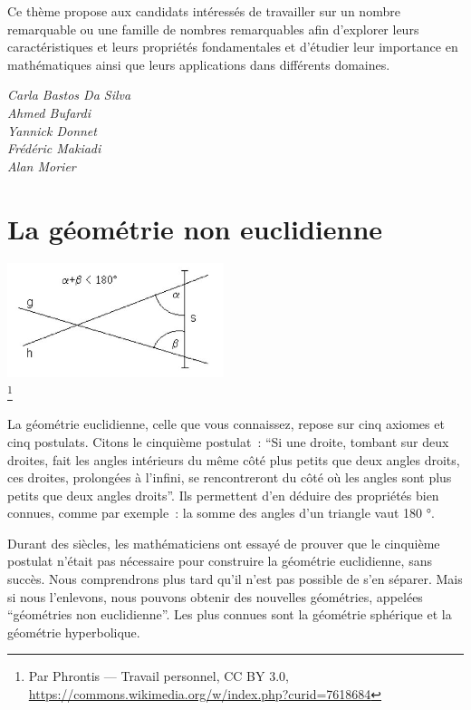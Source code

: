 \documentclass[
  10pt,
  french,
  a5paper,
  openany]{book}
\newenvironment{signature}{\begin{flushright}}{\end{flushright}}
\begin{document}
Ce thème propose aux candidats intéressés de travailler sur un nombre remarquable ou une famille de nombres remarquables afin d'explorer leurs caractéristiques et leurs propriétés fondamentales et d'étudier leur importance en mathématiques ainsi que leurs applications dans différents domaines.

\begin{signature}
\emph{Carla Bastos Da Silva}\\
\emph{Ahmed Bufardi}\\
\emph{Yannick Donnet}\\
\emph{Frédéric Makiadi}\\
\emph{Alan Morier}

\end{signature}

\hypertarget{la-guxe9omuxe9trie-non-euclidienne}{%
\chapter{La géométrie non euclidienne}\label{la-guxe9omuxe9trie-non-euclidienne}}


\begin{center}
\includegraphics[width=\textwidth,height=9em]{images/la-geometrie-non-euclidienne-1.jpg}\\
\footnote{Par Phrontis --- Travail personnel, CC BY 3.0, \url{https://commons.wikimedia.org/w/index.php?curid=7618684}}

\end{center}

La géométrie euclidienne, celle que vous connaissez, repose sur cinq axiomes et cinq postulats. Citons le cinquième postulat~: ``Si une droite, tombant sur deux droites, fait les angles intérieurs du même côté plus petits que deux angles droits, ces droites, prolongées à l'infini, se rencontreront du côté où les angles sont plus petits que deux angles droits''. Ils permettent d'en déduire des propriétés bien connues, comme par exemple~: la somme des angles d'un triangle vaut 180 °.

Durant des siècles, les mathématiciens ont essayé de prouver que le cinquième postulat n'était pas nécessaire pour construire la géométrie euclidienne, sans succès. Nous comprendrons plus tard qu'il n'est pas possible de s'en séparer. Mais si nous l'enlevons, nous pouvons obtenir des nouvelles géométries, appelées ``géométries non euclidienne''. Les plus connues sont la géométrie sphérique et la géométrie hyperbolique.
\end{document}
